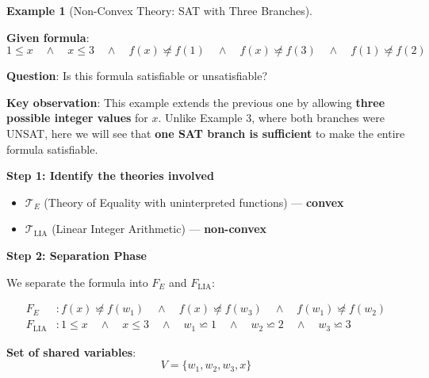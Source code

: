 \documentclass[11pt,a4paper]{article}
\theoremstyle{definition}
\newtheorem{example}{Example}[section]
\theoremstyle{plain}
\theoremstyle{remark}
\begin{document}
\begin{example}[Non-Convex Theory: SAT with Three Branches]
\begin{tcolorbox}[colback=green!5!white,colframe=green!75!black,title=\textbf{Example 4: Non-Convex $\mathcal{T}_{\text{LIA}}$ — One SAT Branch Suffices},breakable]
\textbf{Given formula}:
\[
1 \leq x \quad \wedge \quad x \leq 3 \quad \wedge \quad f(x) \not\backsimeq f(1) \quad \wedge \quad f(x) \not\backsimeq f(3) \quad \wedge \quad f(1) \not\backsimeq f(2)
\]

\textbf{Question}: Is this formula satisfiable or unsatisfiable?

\vspace{0.5em}

\textbf{Key observation}: This example extends the previous one by allowing \textbf{three possible integer values} for $x$. Unlike Example 3, where both branches were UNSAT, here we will see that \textbf{one SAT branch is sufficient} to make the entire formula satisfiable.

\vspace{0.5em}

\textbf{Step 1: Identify the theories involved}

\begin{itemize}
    \item $\mathcal{T}_E$ (Theory of Equality with uninterpreted functions) — \textbf{convex}
    \item $\mathcal{T}_{\text{LIA}}$ (Linear Integer Arithmetic) — \textbf{non-convex}
\end{itemize}

\vspace{0.5em}

\textbf{Step 2: Separation Phase}

We separate the formula into $F_E$ and $F_{\text{LIA}}$:

\begin{align*}
F_E &: f(x) \not\backsimeq f(w_1) \quad \wedge \quad f(x) \not\backsimeq f(w_3) \quad \wedge \quad f(w_1) \not\backsimeq f(w_2) \\
F_{\text{LIA}} &: 1 \leq x \quad \wedge \quad x \leq 3 \quad \wedge \quad w_1 \backsimeq 1 \quad \wedge \quad w_2 \backsimeq 2 \quad \wedge \quad w_3 \backsimeq 3
\end{align*}

\textbf{Set of shared variables}:
\[
V = \{w_1, w_2, w_3, x\}
\]

\vspace{0.5em}


\end{tcolorbox}
\end{example}
\end{document}
